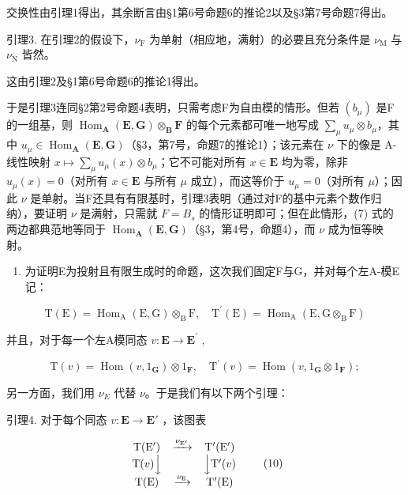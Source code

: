 交换性由引理1得出，其余断言由§1第6号命题6的推论2以及§3第7号命题7得出。

引理3. 在引理2的假设下，\(\nu_{\mathrm{F}}\) 为单射（相应地，满射）的必要且充分条件是 \(\nu_{\mathrm{M}}\) 与 \(\nu_{\mathrm{N}}\) 皆然。

这由引理2及§1第6号命题6的推论1得出。

于是引理3连同§2第2号命题4表明，只需考虑F为自由模的情形。但若 \((b_{\mu})\) 是F的一组基，则 \(\operatorname{Hom}_{\mathbf{A}}(\mathbf{E}, \mathbf{G}) \otimes_{\mathbf{B}} \mathbf{F}\) 的每个元素都可唯一地写成 \(\sum_{\mu} u_{\mu} \otimes b_{\mu}\)，其中 \(u_{\mu} \in \operatorname{Hom}_{\mathbf{A}}(\mathbf{E}, \mathbf{G})\)（§3，第7号，命题7的推论1）；该元素在 \(\nu\) 下的像是 A-线性映射 \(x \mapsto \sum_{\mu} u_{\mu}(x) \otimes b_{\mu}\)；它不可能对所有 \(x \in \mathbf{E}\) 均为零，除非 \(u_{\mu}(x) = 0\)（对所有 \(x \in \mathbf{E}\) 与所有 \(\mu\) 成立），而这等价于 \(u_{\mu} = 0\)（对所有 \(\mu\)）；因此 \(\nu\) 是单射。当F还具有有限基时，引理3表明（通过对F的基中元素个数作归纳），要证明 \(\nu\) 是满射，只需就 \(F = B_s\) 的情形证明即可；但在此情形，(7) 式的两边都典范地等同于 \(\operatorname{Hom}_{\mathbf{A}}(\mathbf{E}, \mathbf{G})\)（§3，第4号，命题4），而 \(\nu\) 成为恒等映射。

\begin{enumerate}
\def\labelenumi{(\roman{enumi})}
\setcounter{enumi}{1}
\tightlist
\item
  为证明E为投射且有限生成时的命题，这次我们固定F与G，并对每个左A-模E记：
\end{enumerate}

\[
\mathrm{T} (\mathrm{E}) = \operatorname{Hom} _ {\mathrm{A}} (\mathrm{E}, \mathrm{G}) \otimes_ {\mathrm{B}} \mathrm{F}, \quad \mathrm{T} ^ {\prime} (\mathrm{E}) = \operatorname{Hom} _ {\mathrm{A}} (\mathrm{E}, \mathrm{G} \otimes_ {\mathrm{B}} \mathrm{F})
\]

并且，对于每一个左A模同态 \(v:\mathbf{E}\to\mathbf{E}^{\prime}\) ,

\[
\mathrm{T} (v) = \operatorname{Hom} (v, 1 _ {\mathbf {G}}) \otimes 1 _ {\mathbf {F}}, \quad \mathrm{T} ^ {\prime} (v) = \operatorname{Hom} (v, 1 _ {\mathbf {G}} \otimes 1 _ {\mathbf {F}});
\]

另一方面，我们用 \(\nu_{E}\) 代替 \(\nu\)。于是我们有以下两个引理：

引理4. 对于每个同态 \(v: \mathbf{E} \to \mathbf{E}'\) ，该图表

\[
\begin{array}{c c c} \mathrm{T} (\mathrm{E} ^ {\prime}) & \xrightarrow {\nu_ {\mathrm{E} ^ {\prime}}} & \mathrm{T} ^ {\prime} (\mathrm{E} ^ {\prime}) \\ \mathrm{T} (v) \Big \downarrow & & \Big \downarrow \mathrm{T} ^ {\prime} (v) \\ \mathrm{T} (\mathrm{E}) & \xrightarrow {\nu_ {\mathrm{E}}} & \mathrm{T} ^ {\prime} (\mathrm{E}) \end{array}\tag{10}
\]

